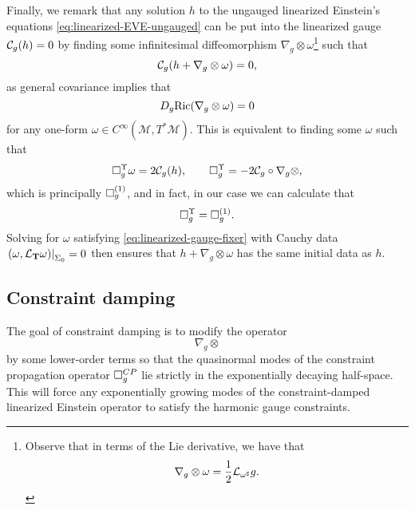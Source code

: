 \documentclass{article}
\begin{document}
Finally, we remark that any solution ${h}$ to the ungauged linearized
Einstein's equations \eqref{eq:linearized-EVE-ungauged} can be put
into the linearized gauge $\mathcal{C}_{g}({h}) = 0$ by finding some
infinitesimal diffeomorphism
$\nabla_{g}\otimes \omega$\footnote{Observe that in terms of the Lie
  derivative, we have that
  \begin{equation*}
    \nabla_{g}\otimes \omega = \frac{1}{2}\mathcal{L}_{\omega^\sharp}g.
  \end{equation*}
}
such that
\begin{equation}
  \mathcal{C}_{g}({h} + \nabla_{g}\otimes \omega) = 0,
\end{equation}
as general covariance implies that
\begin{equation*}
  D_{g}\text{Ric}(\nabla_{g}\otimes \omega) = 0
\end{equation*}
for any one-form $\omega\in C^\infty(\mathcal{M},
T^*\mathcal{M})$. This is equivalent to finding some
$\omega$ such that
\begin{equation}
  \label{eq:linearized-gauge-fixer}
  \Box_{g}^\Upsilon\omega = 2\mathcal{C}_{g}({h}),\qquad
  \Box_{g}^{\Upsilon} = -2\mathcal{C}_{g}\circ \nabla_{g}\otimes ,
\end{equation}
which is principally $\Box^{(1)}_g$, and in fact, in our case we
can calculate that
\begin{equation*}
  \Box_{g}^\Upsilon = \Box^{(1)}_g. 
\end{equation*}
Solving for $\omega$ satisfying \eqref{eq:linearized-gauge-fixer} with
Cauchy data
$\left.(\omega, \mathcal{L}_{\mathbf{T}}\omega)\right\vert_{\Sigma_0}=
0$ then ensures that $h +\nabla_g\otimes \omega$ has the same initial
data as $h$.


\subsection{Constraint damping}
\label{sec:constraint-damping}

The goal of constraint damping is to modify the operator
\begin{equation*}
  \nabla_g\otimes
\end{equation*}
by some lower-order terms so that the quasinormal modes of the
constraint propagation operator $\Box^{CP}_g$ lie
strictly in the exponentially decaying half-space. This will force any
exponentially growing modes of the constraint-damped linearized
Einstein operator to satisfy the harmonic gauge constraints.
\end{document}
